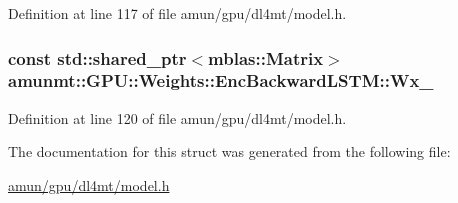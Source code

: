 Definition at line 117 of file amun/gpu/dl4mt/model.\+h.

\subsubsection[{\texorpdfstring{Wx\+\_\+}{Wx_}}]{\setlength{\rightskip}{0pt plus 5cm}const std\+::shared\+\_\+ptr$<${\bf mblas\+::\+Matrix}$>$ amunmt\+::\+G\+P\+U\+::\+Weights\+::\+Enc\+Backward\+L\+S\+T\+M\+::\+Wx\+\_\+}\hypertarget{structamunmt_1_1GPU_1_1Weights_1_1EncBackwardLSTM_adb36eb2b67933d70305912cbc40f0a30}{}\label{structamunmt_1_1GPU_1_1Weights_1_1EncBackwardLSTM_adb36eb2b67933d70305912cbc40f0a30}


Definition at line 120 of file amun/gpu/dl4mt/model.\+h.



The documentation for this struct was generated from the following file\+:\begin{DoxyCompactItemize}
\item 
\hyperlink{amun_2gpu_2dl4mt_2model_8h}{amun/gpu/dl4mt/model.\+h}\end{DoxyCompactItemize}
